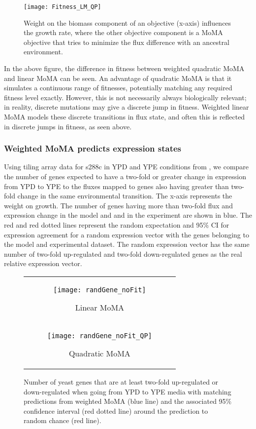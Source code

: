 \begin{figure}
\centering
  \texttt{[image: Fitness\_LM\_QP]}
  \caption{Weight on the biomass component of an objective (x-axis)
  influences the growth rate, where the other objective component is a
  MoMA objective that tries to minimize the flux difference with an
  ancestral environment.}
  \label{fig:Fitness_LM_QP}
\end{figure}

In the above figure, the difference in fitness between weighted
quadratic MoMA and linear MoMA can be seen. An advantage of quadratic
MoMA is that it simulates a continuous range of fitnesses, potentially
matching any required fitness level exactly.  However, this is not
necessarily always biologically relevant; in reality, discrete mutations may give
a discrete jump in fitness. Weighted linear MoMA models these discrete
transitions in flux state, and often this is reflected in discrete
jumps in fitness, as seen above.

\subsubsection{Weighted MoMA predicts expression states}

Using tiling array data for s288c in YPD and YPE conditions from
\citet{Xu2009}, we compare the number of genes expected to have a
two-fold or greater change in expression from YPD to YPE to the fluxes
mapped to genes also having greater than two-fold change in the same
environmental transition. The x-axis represents the weight on
growth. The number of
genes having more than two-fold flux and expression change in the model and and
in the experiment are shown in blue. The red and red dotted lines
represent the random expectation and 95\% CI for expression agreement
for a random expression vector with the genes belonging to the model
and experimental dataset. The random expression vector has the same
number of two-fold up-regulated and two-fold down-regulated genes as the
real relative expression vector.

\begin{figure}
\centering
\begin{tabular}{c}
\begin{subfigure}[b]{\textwidth}
  \texttt{[image: randGene\_noFit]}
  \caption{Linear MoMA} 
  \label{fig:randGene_noFit}
\end{subfigure}
\\
\begin{subfigure}[b]{\textwidth}
  \texttt{[image: randGene\_noFit\_QP]}
  \caption{Quadratic MoMA} 
  \label{fig:randGene_noFit_QP}
\end{subfigure}
\\
\end{tabular}
\caption{Number of yeast genes that are at least two-fold up-regulated
or down-regulated when going from YPD to YPE media with matching
predictions from weighted MoMA (blue line) and the associated 95\%
confidence interval (red dotted line) around the prediction to random
chance (red line).}
\label{fig:wMoMA_expMatch}
\end{figure}


